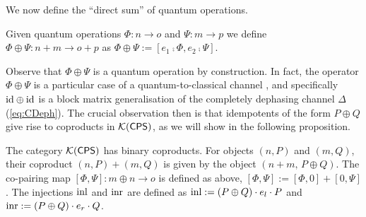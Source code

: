 We now define the ``direct sum'' of quantum operations.
\begin{definition}
  Given quantum operations $\Phi: n \to o$ and $\Psi: m \to p$ we define $\Phi
\oplus \Psi: n + m \to o+p$ as $\Phi
\oplus \Psi := [e_1 \comp \Phi, e_2 \comp \Psi]$.
\end{definition}

Observe that $\Phi \oplus \Psi$ is a quantum operation by
construction. In fact,  the operator $\Phi \oplus \Psi$ is a particular case of a
 quantum-to-classical channel , and
specifically $\mathrm{id} \oplus \mathrm{id}$ is a block matrix generalisation of the
completely dephasing channel $\Delta$ (\autoref{eq:CDeph}). The crucial
observation then is that idempotents of the form $P \oplus Q$ give rise to
coproducts in $\mathcal{K}{(\mathsf{CPS})}$, as we will show in the following proposition.


\begin{proposition} \label{prop:K(cps)_bin_cop}
        The category $\mathcal{K}{(\mathsf{CPS})}$ has binary coproducts. For objects $(n,P)$ and $(m,Q)$, their coproduct $(n,P) + (m,Q)$ is given by the object $(n+m,\, P \oplus Q)$.  The co-pairing map $[\Phi, \Psi]: m \oplus n \to o$ is defined as  above, $[\Phi, \Psi] := [\Phi, 0] + [0, \Psi]$. The injections $\mathrm{inl}$ and $\mathrm{inr}$ are defined as $\mathrm{inl} := (P \oplus Q)
        \cdot e_l \cdot P$ and $\mathrm{inr} := (P \oplus Q) \cdot e_r \cdot Q$.
\end{proposition}


